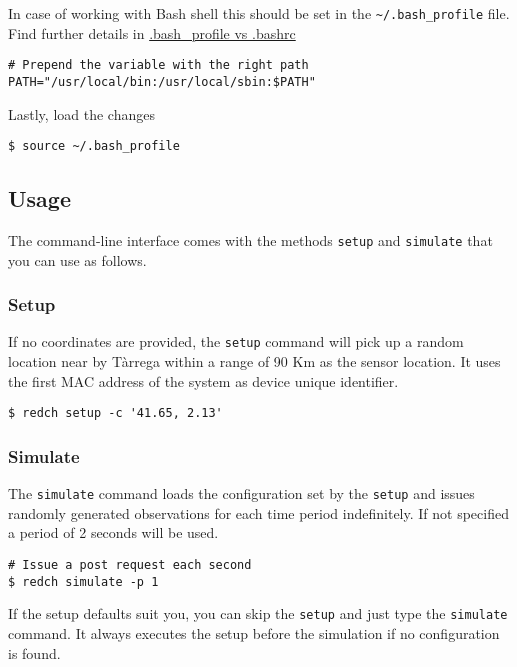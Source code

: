 In case of working with Bash shell this should be set in the
\texttt{\textasciitilde{}/.bash\_profile} file. Find further details in
\href{http://www.joshstaiger.org/archives/2005/07/bash_profile_vs.html}{.bash\_profile
vs .bashrc}

\begin{verbatim}
# Prepend the variable with the right path
PATH="/usr/local/bin:/usr/local/sbin:$PATH"
\end{verbatim}

Lastly, load the changes

\begin{verbatim}
$ source ~/.bash_profile
\end{verbatim}

\subsection*{Usage}\label{usage}

The command-line interface comes with the methods \texttt{setup} and
\texttt{simulate} that you can use as follows.

\subsubsection*{Setup}\label{setup}

If no coordinates are provided, the \texttt{setup} command will pick up
a random location near by Tàrrega within a range of 90 Km as the sensor
location. It uses the first MAC address of the system as device unique
identifier.

\begin{verbatim}
$ redch setup -c '41.65, 2.13'
\end{verbatim}

\subsubsection*{Simulate}\label{simulate}

The \texttt{simulate} command loads the configuration set by the
\texttt{setup} and issues randomly generated observations for each time
period indefinitely. If not specified a period of 2 seconds will be
used.

\begin{verbatim}
# Issue a post request each second
$ redch simulate -p 1
\end{verbatim}

If the setup defaults suit you, you can skip the \texttt{setup} and just
type the \texttt{simulate} command. It always executes the setup before
the simulation if no configuration is found.

